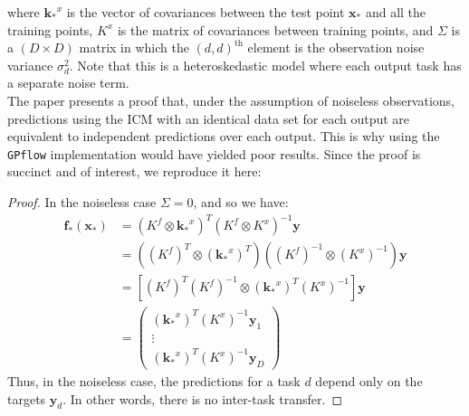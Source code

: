 \documentclass[a4paper,12pt]{article}
\begin{document}
where $\mathbf{k_*}^x$ is the vector of covariances between the test point $\mathbf{x_*}$ and all the training points, $K^x$ is the matrix of covariances between training points, and $\Sigma$ is a $(D \times D)$ matrix in which the $(d,d)^\text{th}$ element is the observation noise variance $\sigma_d^2$. Note that this is a heteroskedastic model where each output task has a separate noise term.\\
The paper presents a proof that, under the assumption of noiseless observations, predictions using the ICM with an identical data set for each output are equivalent to independent predictions over each output. This is why using the \texttt{GPflow} implementation would have yielded poor results. Since the proof is succinct and of interest, we reproduce it here:
\begin{proof}
In the noiseless case $\Sigma = 0$, and so we have:
\begin{align*}
    \mathbf{f_*}(\mathbf{x_*}) &= (K^f \otimes \mathbf{k_*}^x)^T (K^f \otimes K^x)^{-1} \mathbf{y}\\
    &= ((K^f)^T \otimes (\mathbf{k_*}^x)^T) ((K^f)^{-1} \otimes (K^x)^{-1}) \mathbf{y}\\
    &= [(K^f)^T (K^f)^{-1} \otimes (\mathbf{k_*}^x)^T (K^x)^{-1}] \mathbf{y}\\
    &= \begin{pmatrix}
        (\mathbf{k_*}^x)^T (K^x)^{-1} \mathbf{y}_1\\
        \vdots\\
        (\mathbf{k_*}^x)^T (K^x)^{-1} \mathbf{y}_D
    \end{pmatrix}
\end{align*}
Thus, in the noiseless case, the predictions for a task $d$ depend only on the targets $\mathbf{y}_d$. In other words, there is no inter-task transfer.
\end{proof}
\end{document}
